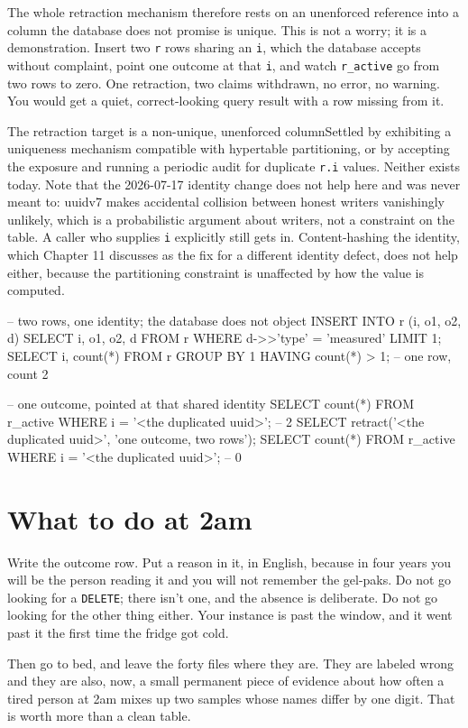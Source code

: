 The whole retraction mechanism therefore rests on an unenforced reference into a column the database does not promise is unique. This is not a worry; it is a demonstration. Insert two \texttt{r} rows sharing an \texttt{i}, which the database accepts without complaint, point one outcome at that \texttt{i}, and watch \texttt{r\_active} go from two rows to zero. One retraction, two claims withdrawn, no error, no warning. You would get a quiet, correct-looking query result with a row missing from it.

\begin{Open}{The retraction target is a non-unique, unenforced column}{Settled by exhibiting a uniqueness mechanism compatible with hypertable partitioning, or by accepting the exposure and running a periodic audit for duplicate \texttt{r.i} values.}
Neither exists today. Note that the 2026-07-17 identity change does not help here and was never meant to: uuidv7 makes accidental collision between honest writers vanishingly unlikely, which is a probabilistic argument about writers, not a constraint on the table. A caller who supplies \texttt{i} explicitly still gets in. Content-hashing the identity, which Chapter 11 discusses as the fix for a different identity defect, does not help either, because the partitioning constraint is unaffected by how the value is computed.
\begin{Check}
-- two rows, one identity; the database does not object
INSERT INTO r (i, o1, o2, d)
SELECT i, o1, o2, d FROM r WHERE d->>'type' = 'measured' LIMIT 1;
SELECT i, count(*) FROM r GROUP BY 1 HAVING count(*) > 1;   -- one row, count 2

-- one outcome, pointed at that shared identity
SELECT count(*) FROM r_active WHERE i = '<the duplicated uuid>';   -- 2
SELECT retract('<the duplicated uuid>', 'one outcome, two rows');
SELECT count(*) FROM r_active WHERE i = '<the duplicated uuid>';   -- 0
\end{Check}
\end{Open}

\section{What to do at 2am}

Write the outcome row. Put a reason in it, in English, because in four years you will be the person reading it and you will not remember the gel-paks. Do not go looking for a \texttt{DELETE}; there isn't one, and the absence is deliberate. Do not go looking for the other thing either. Your instance is past the window, and it went past it the first time the fridge got cold.

Then go to bed, and leave the forty files where they are. They are labeled wrong and they are also, now, a small permanent piece of evidence about how often a tired person at 2am mixes up two samples whose names differ by one digit. That is worth more than a clean table.
